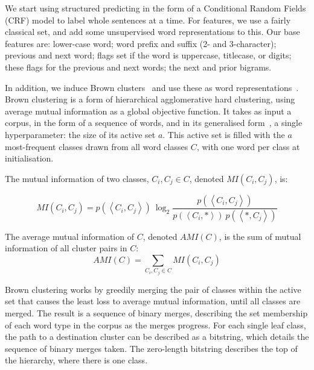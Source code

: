 \documentclass[sigconf]{acmart}
\begin{document}
We start using structured predicting in the form of a Conditional Random Fields (CRF) model to label whole sentences at a time.
For features, we use a fairly classical set, and add some unsupervised word representations to this.
Our base features are: lower-case word; word prefix and suffix (2- and 3-character); previous and next word; flags set if the word is uppercase, titlecase, or digits; these flags for the previous and next words; the next and prior bigrams.

In addition, we induce Brown clusters~\cite{brown1992class} and use these as word representations~\cite{turian2009preliminary}.
Brown clustering is a form of hierarchical agglomerative hard clustering, using average mutual information as a global objective function.
It takes as input a corpus, in the form of a sequence of words, and in its generalised form~\cite{derczynski2016generalised}, a single hyperparameter: the size of its active set $a$.
This active set is filled with the $a$ most-frequent classes drawn from all word classes $C$, with one word per class at initialisation.

The mutual information of two classes, $C_i,C_j\in C$, denoted $MI(C_i,C_j)$, is:

\begin{equation}
MI(C_i,C_j)=
p(\left<C_i,C_j\right>)\ \log_2{\frac{p(\left<C_i,C_j\right>)}{p(\left<C_i,*\right>)\ p(\left<*,C_j\right>)}}
\end{equation}

The average mutual information of $C$, denoted $AMI(C)$, is the sum of mutual information of all cluster pairs in $C$:
\begin{equation}
AMI(C) = \sum_{C_i,C_j\in C}{MI(C_i,C_j)}
\end{equation}

Brown clustering works by greedily merging the pair of classes within the active set that causes the least loss to average mutual information, until all classes are merged.
The result is a sequence of binary merges, describing the set membership of each word type in the corpus as the merges progress.
For each single leaf class, the path to a destination cluster can be described as a bitstring, which details the sequence of binary merges taken.
The zero-length bitstring describes the top of the hierarchy, where there is one class.
\end{document}
